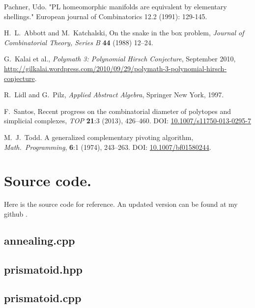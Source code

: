 \documentclass[12pt,a4paper]{article}
\theoremstyle{plain}
\theoremstyle{definition}
\begin{document}
\begin{thebibliography}{99}
  Pachner, Udo. "PL homeomorphic manifolds are equivalent by elementary shellings." European journal of Combinatorics 12.2 (1991): 129-145.

H.~L.~Abbott and M.~Katchalski, On the snake in the box problem, \emph{Journal of Combinatorial Theory, Series B} {\bf 44} (1988) 12--24.

G.~Kalai et al., \emph{Polymath 3: Polynomial Hirsch Conjecture}, September 2010,
\href{http://gilkalai.wordpress.com/2010/09/29/polymath-3-polynomial-hirsch-conjecture}
{http://gilkalai.wordpress.com/2010/09/29/polymath-3-polynomial-hirsch-conjecture}.

R.~Lidl and G.~Pilz,
 \emph{Applied Abstract Algebra},
 Springer New York, 1997.

F.~Santos, Recent progress on the combinatorial diameter of polytopes and simplicial complexes,
\emph{TOP} {\bf 21}:3 (2013), 426--460. 
DOI: \href{http://dx.doi.org/10.1007/s11750-013-0295-7}{10.1007/s11750-013-0295-7}

M.~J.~Todd.
A generalized complementary pivoting algorithm,
\emph{Math.~Programming}, {\bf 6}:1 (1974), 243--263.
DOI:  \href{http://dx.doi.org/10.1007/BF01580244}{10.1007/bf01580244}.

\end{thebibliography}

\newpage
\appendix
\section{Source code.}
Here is the source code for reference. An updated version can be found at my github \cite{github}.
\subsection{annealing.cpp}

\subsection{prismatoid.hpp}

\subsection{prismatoid.cpp}

\end{document}
